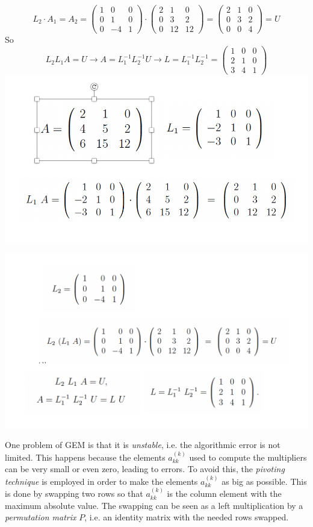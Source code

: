 $$
L_2 \cdot A_1 = A_2 = 
\begin{pmatrix}
1 & 0 & 0\\
0 & 1 & 0\\
0 & -4 & 1
\end{pmatrix} \cdot
\begin{pmatrix}
2 & 1 & 0\\
0 & 3 & 2\\
0 & 12 & 12
\end{pmatrix} = 
\begin{pmatrix}
2 & 1 & 0\\
0 & 3 & 2\\
0 & 0 & 4
\end{pmatrix} = U
$$
So
$$
L_2L_1A=U \longrightarrow A=L_1^{-1}L_2^{-1}U \longrightarrow L=L_1^{-1}L_2^{-1}=
\begin{pmatrix}
1 & 0 & 0\\
2 & 1 & 0\\
3 & 4 & 1
\end{pmatrix}
$$
\includegraphics[width=0.7 \textwidth]{sections/lu1.png}

\includegraphics[width=0.8 \textwidth]{sections/lu2.png}

One problem of GEM is that it is \textit{unstable}, i.e. the algorithmic error is not limited. This happens because the elements $a^{(k)}_{kk}$ used to compute the multipliers can be very small or even zero, leading to errors. To avoid this, the \textit{pivoting technique} is employed in order to make the elements $a^{(k)}_{kk}$ as big as possible. This is done by swapping two rows so that $a^{(k)}_{kk}$ is the column element with the maximum absolute value. The swapping can be seen as a left multiplication by a \textit{permutation matrix} $P$, i.e. an identity matrix with the needed rows swapped. 

